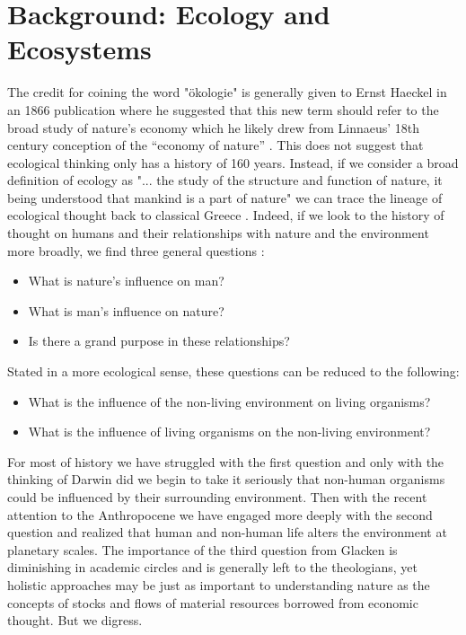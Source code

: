 \section {Background: Ecology and Ecosystems}

The credit for coining the word "ökologie" is generally given to Ernst Haeckel in an 1866 publication where he suggested that this new term should refer to the broad study of nature's economy which he likely drew from Linnaeus’ 18th century conception of the “economy of nature” \cite{worster_1977}. This does not suggest that ecological thinking only has a history of 160 years. Instead, if we consider a broad definition of ecology as "... the study of the structure and function of nature, it being understood that mankind is a part of nature" we can trace the lineage of ecological thought back to classical Greece \cite{odum_1953}. Indeed, if we look to the history of thought on humans and their relationships with nature and the environment more broadly, we find three general questions \cite{glacken_1967}: \begin{itemize} \item What is nature's influence on man? \item What is man's influence on nature? \item Is there a grand purpose in these relationships? \end{itemize} Stated in a more ecological sense, these questions can be reduced to the following: \begin{itemize} \item What is the influence of the non-living environment on living organisms? \item What is the influence of living organisms on the non-living environment? \end{itemize} For most of history we have struggled with the first question and only with the thinking of Darwin did we begin to take it seriously that non-human organisms could be influenced by their surrounding environment. Then with the recent attention to the Anthropocene we have engaged more deeply with the second question and realized that human and non-human life alters the environment at planetary scales. The importance of the third question from Glacken is diminishing in academic circles and is generally left to the theologians, yet holistic approaches may be just as important to understanding nature as the concepts of stocks and flows of material resources borrowed from economic thought. But we digress.  

